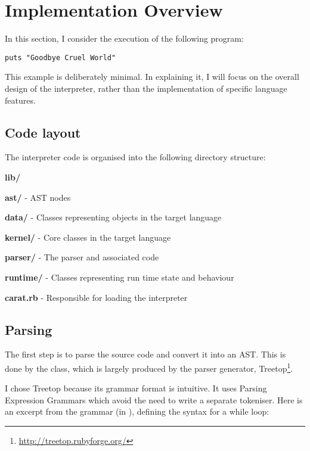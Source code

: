 \section{Implementation Overview}

In this section, I consider the execution of the following program:

\begin{lstlisting}
puts "Goodbye Cruel World"
\end{lstlisting}

This example is deliberately minimal. In explaining it, I will focus on the overall design of the interpreter, rather than the implementation of specific language features.

\subsection{Code layout}

The interpreter code is organised into the following directory structure:

\begin{dirlist}
  \item \textbf{lib/}
    \begin{dirlist}
      \item \textbf{ast/} - AST nodes
      \item \textbf{data/} - Classes representing objects in the target language
      \item \textbf{kernel/} - Core classes in the target language
      \item \textbf{parser/} - The parser and associated code
      \item \textbf{runtime/} - Classes representing run time state and behaviour
      \item \textbf{carat.rb} - Responsible for loading the interpreter
    \end{dirlist}
\end{dirlist}

\subsection{Parsing}

The first step is to parse the source code and convert it into an AST. This is done by the  class, which is largely produced by the parser generator, Treetop\footnote{\url{http://treetop.rubyforge.org/}}.

I chose Treetop because its grammar format is intuitive. It uses Parsing Expression Grammars which avoid the need to write a separate tokeniser. Here is an excerpt from the grammar (in ), defining the syntax for a while loop:

